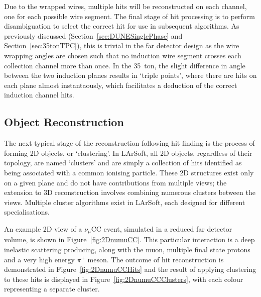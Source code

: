 Due to the wrapped wires, multiple hits will be reconstructed on each channel, one for each possible wire segment.  The final stage of hit processing is to perform disambiguation to select the correct hit for use in subsequent algorithms.  As previously discussed (Section~\ref{sec:DUNESinglePhase} and Section~\ref{sec:35tonTPC}), this is trivial in the far detector design as the wire wrapping angles are chosen such that no induction wire segment crosses each collection channel more than once.  In the 35~ton, the slight difference in angle between the two induction planes results in `triple points', where there are hits on each plane almost instantaously, which facilitates a deduction of the correct induction channel hits.

\subsection{Object Reconstruction}\label{sec:ObjectReconstruction}

The next typical stage of the reconstruction following hit finding is the process of forming 2D objects, or `clustering'.  In LArSoft, all 2D objects, regardless of their topology, are named `clusters' and are simply a collection of hits identified as being associated with a common ionising particle.  These 2D structures exist only on a given plane and do not have contributions from multiple views; the extension to 3D reconstruction involves combining numerous clusters between the views.  Multiple cluster algorithms exist in LArSoft, each designed for different specialisations.

An example 2D view of a $\nu_{\mu}$CC event, simulated in a reduced far detector volume, is shown in Figure~\ref{fig:2DnumuCC}.  This particular interaction is a deep inelastic scattering producing, along with the muon, multiple final state protons and a very high energy $\pi^+$ meson.  The outcome of hit reconstruction is demonstrated in Figure~\ref{fig:2DnumuCCHits} and the result of applying clustering to these hits is displayed in Figure~\ref{fig:2DnumuCCClusters}, with each colour representing a separate cluster.

